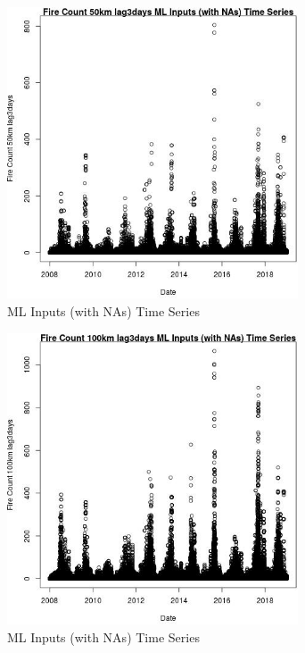 \begin{figure} 
\centering  
\includegraphics[width=0.77\textwidth]{Code_Outputs/Report_ML_input_PM25_Step4_part_f_de_duplicated_aves_prioritize_24hr_obswNAs_Fire_Count_50km_lag3daysvDate.jpg} 
\caption{\label{fig:Report_ML_input_PM25_Step4_part_f_de_duplicated_aves_prioritize_24hr_obswNAsFire_Count_50km_lag3daysvDate}ML Inputs (with NAs) Time Series} 
\end{figure} 
 

\begin{figure} 
\centering  
\includegraphics[width=0.77\textwidth]{Code_Outputs/Report_ML_input_PM25_Step4_part_f_de_duplicated_aves_prioritize_24hr_obswNAs_Fire_Count_100km_lag3daysvDate.jpg} 
\caption{\label{fig:Report_ML_input_PM25_Step4_part_f_de_duplicated_aves_prioritize_24hr_obswNAsFire_Count_100km_lag3daysvDate}ML Inputs (with NAs) Time Series} 
\end{figure} 
 

